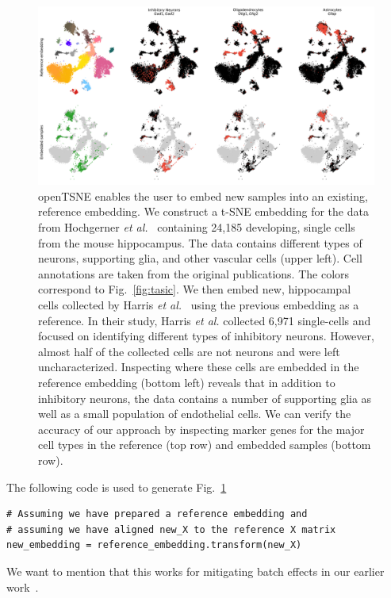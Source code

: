\documentclass[twocolumn]{bmcart}
\begin{document}
\begin{figure}[htbp]
  \includegraphics[width=\textwidth]{transform_hochgerner}
  \caption{\label{fig:transform}openTSNE enables the user to embed new samples into an existing, reference embedding. We construct a t-SNE embedding for the data from Hochgerner \textit{et al.}~\cite{hochgerner2018conserved} containing 24,185 developing, single cells from the mouse hippocampus. The data contains different types of neurons, supporting glia, and other vascular cells (upper left). Cell annotations are taken from the original publications. The colors correspond to Fig.~\ref{fig:tasic}. We then embed new, hippocampal cells collected by Harris \textit{et al.}~\cite{harris2018classes} using the previous embedding as a reference. In their study, Harris \textit{et al.} collected 6,971 single-cells and focused on identifying different types of inhibitory neurons. However, almost half of the collected cells are not neurons and were left uncharacterized. Inspecting where these cells are embedded in the reference embedding (bottom left) reveals that in addition to inhibitory neurons, the data contains a number of supporting glia as well as a small population of endothelial cells. We can verify the accuracy of our approach by inspecting marker genes for the major cell types in the reference (top row) and embedded samples (bottom row).}
\end{figure}


The following code is used to generate Fig.~\ref{fig:transform}
\begin{verbatim}
# Assuming we have prepared a reference embedding and
# assuming we have aligned new_X to the reference X matrix
new_embedding = reference_embedding.transform(new_X)
\end{verbatim}

We want to mention that this works for mitigating batch effects in our earlier work~\cite{policar2019embedding}.
\end{document}
